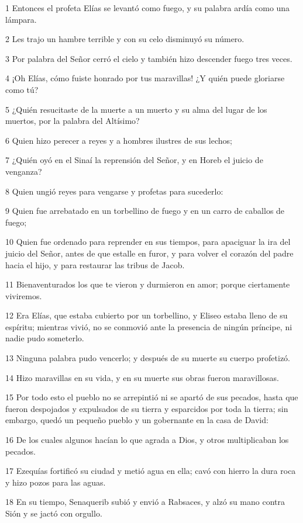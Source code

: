 \par 1 Entonces el profeta Elías se levantó como fuego, y su palabra ardía como una lámpara.
\par 2 Les trajo un hambre terrible y con su celo disminuyó su número.
\par 3 Por palabra del Señor cerró el cielo y también hizo descender fuego tres veces.
\par 4 ¡Oh Elías, cómo fuiste honrado por tus maravillas! ¿Y quién puede gloriarse como tú?
\par 5 ¿Quién resucitaste de la muerte a un muerto y su alma del lugar de los muertos, por la palabra del Altísimo?
\par 6 Quien hizo perecer a reyes y a hombres ilustres de sus lechos;
\par 7 ¿Quién oyó en el Sinaí la reprensión del Señor, y en Horeb el juicio de venganza?
\par 8 Quien ungió reyes para vengarse y profetas para sucederlo:
\par 9 Quien fue arrebatado en un torbellino de fuego y en un carro de caballos de fuego;
\par 10 Quien fue ordenado para reprender en sus tiempos, para apaciguar la ira del juicio del Señor, antes de que estalle en furor, y para volver el corazón del padre hacia el hijo, y para restaurar las tribus de Jacob.
\par 11 Bienaventurados los que te vieron y durmieron en amor; porque ciertamente viviremos.
\par 12 Era Elías, que estaba cubierto por un torbellino, y Eliseo estaba lleno de su espíritu; mientras vivió, no se conmovió ante la presencia de ningún príncipe, ni nadie pudo someterlo.
\par 13 Ninguna palabra pudo vencerlo; y después de su muerte su cuerpo profetizó.
\par 14 Hizo maravillas en su vida, y en su muerte sus obras fueron maravillosas.
\par 15 Por todo esto el pueblo no se arrepintió ni se apartó de sus pecados, hasta que fueron despojados y expulsados ​​de su tierra y esparcidos por toda la tierra; sin embargo, quedó un pequeño pueblo y un gobernante en la casa de David:
\par 16 De los cuales algunos hacían lo que agrada a Dios, y otros multiplicaban los pecados.
\par 17 Ezequías fortificó su ciudad y metió agua en ella; cavó con hierro la dura roca y hizo pozos para las aguas.
\par 18 En su tiempo, Senaquerib subió y envió a Rabsaces, y alzó su mano contra Sión y se jactó con orgullo.
